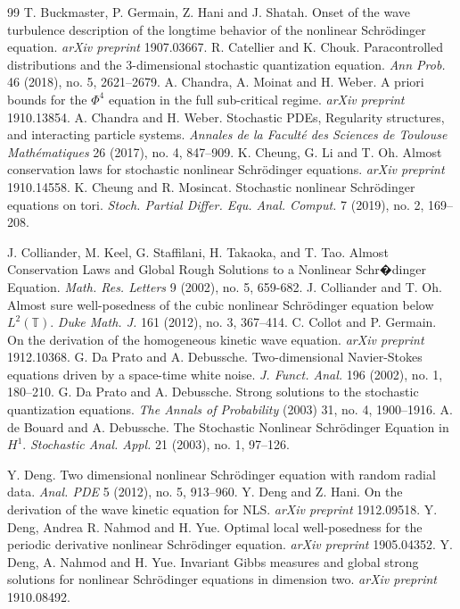 \documentclass[11 pt,reqno]{amsart}
\theoremstyle{definition}
\theoremstyle{remark}
\numberwithin{equation}{section}
\newcommand{\Tb}{\mathbb{T}}
\begin{document}
{{\begin{thebibliography}{99}
 T. Buckmaster, P. Germain, Z. Hani and J. Shatah. Onset of the wave turbulence description of the longtime behavior of the nonlinear Schr\"{o}dinger equation. \emph{arXiv preprint} 1907.03667.
   R. Catellier and K. Chouk.  Paracontrolled distributions and the 3-dimensional stochastic quantization equation.  {\em Ann Prob.} 46 (2018), no. 5, 2621--2679.
    A. Chandra, A. Moinat and H. Weber. A priori bounds for the $\Phi^4$ equation in the full sub-critical regime. \emph{arXiv preprint} 1910.13854.
  A. Chandra and H. Weber.   Stochastic PDEs, Regularity structures, and interacting particle systems.\emph{ Annales de la Facult\'e des Sciences de Toulouse Math\'{e}matiques} 26 (2017), no. 4,  847--909.
   K. Cheung, G. Li and T. Oh. Almost conservation laws for stochastic nonlinear Schr\"{o}dinger equations. \emph{arXiv preprint} 1910.14558.
 K. Cheung and R. Mosincat. Stochastic nonlinear Schr\"{o}dinger equations on tori. \emph{Stoch. Partial Differ. Equ. Anal. Comput.} 7 (2019), no. 2, 169--208.
 
  J. Colliander, M. Keel, G. Staffilani, H. Takaoka, and T. Tao. Almost Conservation Laws and Global Rough Solutions to a Nonlinear Schr�dinger Equation. \emph{Math. Res. Letters} 9 (2002), no. 5, 659-682.
  J. Colliander and T. Oh. Almost sure well-posedness of the cubic nonlinear Schr\"{o}dinger equation below $L^2(\Tb)$. \emph{Duke Math. J.} 161 (2012), no. 3, 367--414.
  C. Collot and P. Germain. On the derivation of the homogeneous kinetic wave equation. \emph{arXiv preprint} 1912.10368.
  G. Da Prato and A. Debussche. Two-dimensional Navier-Stokes equations driven by a space-time white noise. \emph{J. Funct. Anal.} 196 (2002), no. 1, 180--210.
  G. Da Prato and A. Debussche. Strong solutions to the stochastic quantization equations. \emph{The Annals of Probability} (2003) 31, no. 4, 1900--1916.
 A. de Bouard and A. Debussche. The Stochastic Nonlinear Schr\"{o}dinger Equation in $H^1$. \emph{Stochastic Anal. Appl.} 21 (2003), no. 1, 97--126.
 
  Y. Deng. Two dimensional nonlinear Schr\"{o}dinger equation with random radial data. \emph{Anal. PDE} 5 (2012), no. 5, 913--960.
  Y. Deng and Z. Hani. On the derivation of the wave kinetic equation for NLS. \emph{arXiv preprint} 1912.09518.
 Y. Deng, Andrea R. Nahmod and H. Yue. Optimal local well-posedness for the periodic derivative nonlinear
Schr\"{o}dinger equation. \emph{arXiv preprint} 1905.04352.
  Y. Deng, A. Nahmod and H. Yue. Invariant Gibbs measures and global strong solutions for nonlinear Schr\"{o}dinger equations in dimension two. \emph{arXiv preprint} 1910.08492.


\end{thebibliography}}}
\end{document}
